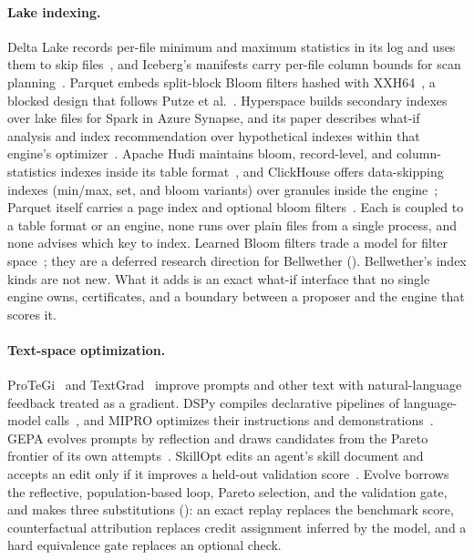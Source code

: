 \paragraph{Lake indexing.} Delta Lake records per-file minimum and maximum
statistics in its log and uses them to skip files~\cite{deltalake}, and
Iceberg's manifests carry per-file column bounds for scan
planning~\cite{icebergspec}. Parquet embeds split-block Bloom filters hashed
with XXH64~\cite{parquetbloom}, a blocked design that follows Putze et
al.~\cite{putze2007}. Hyperspace builds secondary indexes over lake files for
Spark in Azure Synapse, and its paper describes what-if analysis and index
recommendation over hypothetical indexes within that engine's
optimizer~\cite{hyperspace}. Apache Hudi maintains bloom, record-level, and column-statistics indexes inside its table format~\cite{hudi}, and ClickHouse offers data-skipping indexes (min/max, set, and bloom variants) over granules inside the engine~\cite{clickhouse}; Parquet itself carries a page index and optional bloom filters~\cite{parquetbloom}. Each is coupled to a table format or an engine, none runs over plain files from a single process, and none advises which key to index. Learned Bloom
filters trade a model for filter space~\cite{plbf2021,plbf2410,cascadedlbf}; they
are a deferred research direction for Bellwether ().
Bellwether's index kinds are not new. What it adds is an exact what-if interface
that no single engine owns, certificates, and a boundary between a proposer and
the engine that scores it.

\paragraph{Text-space optimization.} ProTeGi~\cite{protegi} and
TextGrad~\cite{textgrad} improve prompts and other text with natural-language
feedback treated as a gradient. DSPy compiles declarative pipelines of
language-model calls~\cite{dspy}, and MIPRO optimizes their instructions and
demonstrations~\cite{mipro}. GEPA evolves prompts by reflection and draws
candidates from the Pareto frontier of its own attempts~\cite{gepa}. SkillOpt
edits an agent's skill document and accepts an edit only if it improves a
held-out validation score~\cite{skillopt}. Evolve borrows the reflective,
population-based loop, Pareto selection, and the validation gate, and makes
three substitutions (): an exact replay replaces the benchmark score,
counterfactual attribution replaces credit assignment inferred by the model,
and a hard equivalence gate replaces an optional check.
